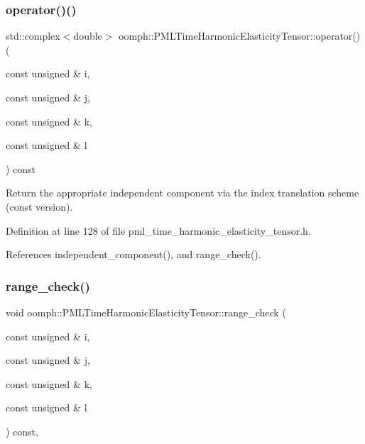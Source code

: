 \subsubsection{\texorpdfstring{operator()()}{operator()()}}
{\footnotesize\ttfamily std\+::complex$<$double$>$ oomph\+::\+P\+M\+L\+Time\+Harmonic\+Elasticity\+Tensor\+::operator() (\begin{DoxyParamCaption}\item[{const unsigned \&}]{i,  }\item[{const unsigned \&}]{j,  }\item[{const unsigned \&}]{k,  }\item[{const unsigned \&}]{l }\end{DoxyParamCaption}) const\hspace{0.3cm}{\ttfamily [inline]}}



Return the appropriate independent component via the index translation scheme (const version). 



Definition at line 128 of file pml\+\_\+time\+\_\+harmonic\+\_\+elasticity\+\_\+tensor.\+h.



References independent\+\_\+component(), and range\+\_\+check().

\mbox{\label{classoomph_1_1PMLTimeHarmonicElasticityTensor_acc5d6de5e961ad67dd72bf032a47bb7b}} 
\subsubsection{\texorpdfstring{range\+\_\+check()}{range\_check()}}
{\footnotesize\ttfamily void oomph\+::\+P\+M\+L\+Time\+Harmonic\+Elasticity\+Tensor\+::range\+\_\+check (\begin{DoxyParamCaption}\item[{const unsigned \&}]{i,  }\item[{const unsigned \&}]{j,  }\item[{const unsigned \&}]{k,  }\item[{const unsigned \&}]{l }\end{DoxyParamCaption}) const\hspace{0.3cm}{\ttfamily [inline]}, {\ttfamily [protected]}}



